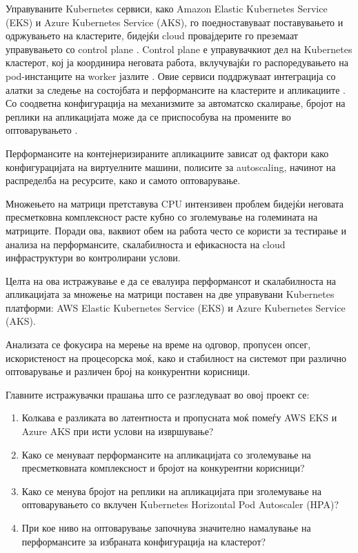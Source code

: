 \documentclass{article}
\begin{document}
Управуваните Kubernetes сервиси, како Amazon Elastic Kubernetes Service (EKS) и Azure Kubernetes Service (AKS), го поедноставуваат поставувањето и одржувањето на кластерите, бидејќи cloud провајдерите го преземаат управувањето со control plane \cite{awsEksDocs,azureAksDocs}. Control plane е управувачкиот дел на Kubernetes кластерот, кој ја координира неговата работа, вклучувајќи го распоредувањето на pod-инстанците на worker јазлите \cite{awsEksDocs}. Овие сервиси поддржуваат интеграција со алатки за следење на состојбата и перформансите на кластерите и апликациите \cite{awsEksDocs,azureAksDocs}. Со соодветна конфигурација на механизмите за автоматско скалирање, бројот на реплики на апликацијата може да се приспособува на промените во оптоварувањето \cite{kubernetesOverview}. 

Перформансите на контејнеризираните апликациите зависат од фактори како конфигурацијата на виртуелните машини, полисите за autoscaling, начинот на распределба на ресурсите, како и самото оптоварување.

Множењето на матрици претставува CPU интензивен проблем бидејќи неговата пресметковна комплексност расте кубно со зголемување на големината на матриците.  Поради ова, ваквиот обем на работа често се користи за тестирање и анализа на перформансите, скалабилноста и ефикасноста на cloud инфраструктури во контролирани услови.

Целта на ова истражување е да се евалуира перформансот и скалабилноста на апликацијата за множење на матрици поставен на две управувани Kubernetes платформи: AWS Elastic Kubernetes Service (EKS) и Azure Kubernetes Service (AKS). 

Анализата се фокусира на мерење на време на одговор, пропусен опсег, искористеност на процесорска моќ, како и стабилност на системот при различно оптоварување и различен број на конкурентни корисници.

Главните истражувачки прашања што се разгледуваат во овој проект се:

\begin{enumerate}
    \item Колкава е разликата во латентноста и пропусната моќ помеѓу AWS EKS и Azure AKS при исти услови на извршување?
    \item Како се менуваат перформансите на апликацијата со зголемување на пресметковната комплексност и бројот на конкурентни корисници?
    \item Како се менува бројот на реплики на апликацијата при зголемување на оптоварувањето со вклучен Kubernetes Horizontal Pod Autoscaler (HPA)?
    \item При кое ниво на оптоварување започнува значително намалување на перформансите за избраната конфигурација на кластерот?
\end{enumerate}
\end{document}
